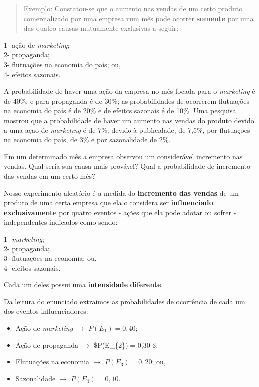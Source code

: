 \documentclass[
]{book}
\providecommand{\tightlist}{%
  \setlength{\itemsep}{0pt}\setlength{\parskip}{0pt}}
\begin{document}
\hfill\break

\begin{quote}
Exemplo: Constatou-se que o aumento nas vendas de um certo produto comercializado por uma empresa num mês pode ocorrer \textbf{somente} por uma das quatro causas mutuamente exclusivas a seguir:
\end{quote}

\hfill\break

1- ação de \emph{marketing};\\
2- propaganda;\\
3- flutuações na economia do país; ou,\\
4- efeitos sazonais.

\hfill\break

A probabilidade de haver uma ação da empresa no mês focada para o \emph{marketing} é de 40\%; e para propaganda é de 30\%; as probabilidades de ocorrerem flutuações na economia do país é de 20\% e de efeitos sazonais é de 10\%. Uma pesquisa mostrou que a probabilidade de haver um aumento nas vendas do produto devido a uma ação de \emph{marketing} é de 7\%; devido à publicidade, de 7,5\%, por flutuações na economia do país, de 3\% e por sazonalidade de 2\%.

\hfill\break

Em um determinado mês a empresa observou um considerável incremento nas vendas. Qual seria sua causa mais provável? Qual a probabilidade de incremento das vendas em um certo mês?

\hfill\break

Nosso experimento aleatório é a medida do \textbf{incremento das vendas} de um produto de uma certa empresa que ela o considera ser \textbf{influenciado exclusivamente} por quatro eventos - ações que ela pode adotar ou sofrer - independentes indicados como sendo:

\hfill\break

1- \emph{marketing};\\
2- propaganda;\\
3- flutuações na economia; ou,\\
4- efeitos sazonais.

Cada um deles possui uma \textbf{intensidade diferente}.

\hfill\break

Da leitura do enunciado extraímos as probabilidades de ocorrência de cada um dos eventos influenciadores:

\hfill\break

\begin{itemize}
\tightlist
\item
  Ação de \emph{marketing} \(\rightarrow\) \(P(E_{1}) = 0,40\);\\
\item
  Ação de propaganda \(\rightarrow\) \$P(E\_\{2\}) = 0,30 \$;\\
\item
  Flutuações na economia \(\rightarrow\) \(P(E_{3}) = 0,20\); ou,\\
\item
  Sazonalidade \(\rightarrow\) \(P(E_{4}) = 0,10\).
\end{itemize}
\end{document}
